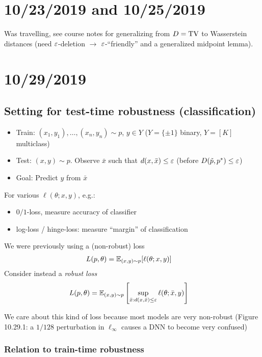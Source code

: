 \section{10/23/2019 and 10/25/2019}

Was travelling, see course notes for generalizing from $D = \operatorname{TV}$
to Wasserstein distances (need $\varepsilon$-deletion $\to$ $\varepsilon$-``friendly''
and a generalized midpoint lemma).

\section{10/29/2019}

\subsection{Setting for test-time robustness (classification)}
\begin{itemize}
  \item Train: $(x_1, y_1), \ldots, (x_n, y_n) \sim p$,
    $y \in Y$ ($Y = \{\pm 1\}$ binary, $Y = [K]$ multiclass)
  \item Test: $(x, y) \sim p$. Observe $\bar{x}$ such that
    $d(x, \bar{x}) \leq \varepsilon$
    (before $D(\tilde{p}, p^*) \leq \varepsilon$)
  \item Goal: Predict $y$ from $\bar{x}$
\end{itemize}

For various $\ell(\theta; x, y)$, e.g.:
\begin{itemize}
  \item $0/1$-loss, measure accuracy of classifier
  \item log-loss / hinge-loss: measure ``margin'' of classification
\end{itemize}
We were previously using a (non-robust) loss
\begin{align}
  L(p, \theta) &= \mathbb{E}_{(x,y) \sim p}[ \ell(\theta; x, y) ]
\end{align}
Consider instead a \emph{robust loss}
\begin{align}
  L(p, \theta) &= \mathbb{E}_{(x,y) \sim p} \left[
    \sup_{\bar{x} : d(x,\bar{x}) \leq \varepsilon} \ell(\theta; \bar{x}, y)
  \right]
\end{align}

We care about this kind of loss because most models are very non-robust
(Figure 10.29.1: a $1/128$ perturbation in $\ell_\infty$
causes a DNN to become very confused)

\subsubsection{Relation to train-time robustness}

